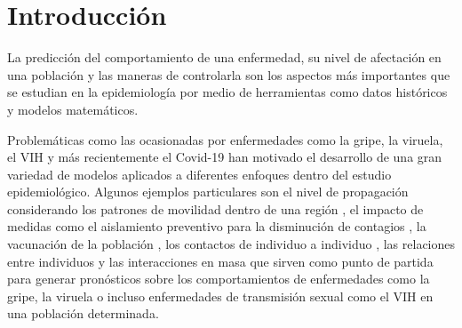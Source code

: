 \chapter{Introducción}\label{ch;Introduccion}

La predicción del comportamiento de una enfermedad, su nivel de afectación en una población y las maneras de controlarla son los aspectos más importantes que se estudian en la epidemiología por medio de herramientas como datos históricos y modelos matemáticos.

Problemáticas como las ocasionadas por enfermedades como la gripe, la viruela, el VIH y más recientemente el Covid-19 han motivado el desarrollo de una gran variedad de modelos aplicados a diferentes enfoques dentro del estudio epidemiológico. Algunos ejemplos particulares son el nivel de propagación considerando los patrones de movilidad dentro de una región \cite{colaGNN, epidemiologicalNeuralNetwork}, el impacto de medidas como el aislamiento preventivo para la disminución de contagios \cite{stayHome}, la vacunación de la población \cite{shortHistory}, los contactos de individuo a individuo \cite{heterogeneousPopulation}, las relaciones entre individuos \cite{redesComplejas} y las interacciones en masa \cite{combiningGraph, transfer2021} que sirven como punto de partida para generar pronósticos sobre los comportamientos de enfermedades como la gripe, la viruela o incluso enfermedades de transmisión sexual como el VIH en una población determinada.

